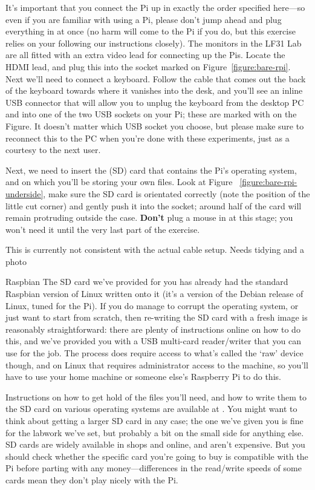 It's important that you connect the Pi up in exactly the order specified here---so even if you are familiar with using a Pi, please don't jump ahead and plug everything in at once (no harm will come to the Pi if you do, but this exercise relies on your following our instructions closely). The monitors in the LF31 Lab are all fitted with an extra video lead for connecting up the Pis. Locate the HDMI lead, and plug this into the socket marked  on Figure~\ref{figure:bare-rpi}. Next we'll need to connect a keyboard. Follow the cable that comes out the back of the keyboard towards where it vanishes into the desk, and you'll see an inline USB connector that will allow you to unplug the keyboard from the desktop PC and into one of the two USB sockets on your Pi; these are marked with  on the Figure. It doesn't matter which USB socket you choose, but please make sure to reconnect this to the PC when you're done with these experiments, just as a courtesy to the next user. 

Next, we need to insert the  (SD) card that contains the Pi's operating system, and on which you'll be storing your own files. Look at Figure ~\ref{figure:bare-rpi-underside}, make sure the SD card is orientated correctly (note the position of the little cut corner) and gently push it into the socket; around half of the card will remain protruding outside the case. \textbf{Don't} plug a mouse in at this stage; you won't need it until the very last part of the exercise.


\begin{note}
This is currently not consistent with the actual cable setup. Needs tidying and a photo
\end{note}

\begin{rpi}{Raspbian}
  The SD card we've provided for you has already had the standard Raspbian version of Linux written onto it (it's a version of the Debian release of Linux, tuned for the Pi). If you do manage to corrupt the operating system, or just want to start from scratch, then re-writing the SD card with a fresh image is reasonably straightforward: there are plenty of instructions online on how to do this, and we've provided you with a USB multi-card reader/writer that you can use for the job. The process does require access to what's called the `raw' device though, and on Linux that requires administrator access to the machine, so you'll have to use your home machine or someone else's Raspberry Pi to do this.

  Instructions on how to get hold of the files you'll need, and how to write them to the SD card on various operating systems are available at . You might want to think about getting a larger SD card in any case; the one we've given you is fine for the labwork we've set, but probably a bit on the small side for anything else. SD cards are widely available in shops and online, and aren't expensive. But you should check whether the specific card you're going to buy is compatible with the Pi before parting with any money---differences in the read/write speeds of some cards mean they don't play nicely with the Pi.
\end{rpi}

